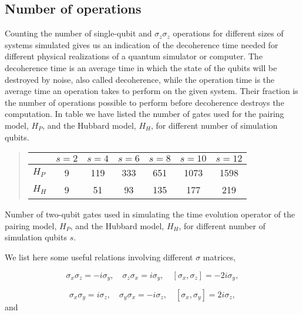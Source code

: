 \documentclass[%
oneside,                 %
final,                   %
10pt]{article}
\begin{document}
\subsection{Number of operations}

Counting the number of single-qubit and $\sigma_z\sigma_z$ operations
for different sizes of systems simulated gives us an indication of the
decoherence time needed for different physical realizations of a
quantum simulator or computer. The decoherence time is an average time
in which the state of the qubits will be destroyed by noise, also called 
decoherence, while the operation time is the average time an operation takes
to perform on the given system. Their fraction is the number of
operations possible to perform before decoherence destroys the
computation. In table  we have listed the number of
gates used for the pairing model, $H_P$, and the Hubbard model, $H_H$,
for different number of simulation qubits. 


\begin{quote}
\begin{tabular}{lcccccc}
\hline
\multicolumn{1}{c}{  } & \multicolumn{1}{c}{ $s=2$ } & \multicolumn{1}{c}{ $s=4$ } & \multicolumn{1}{c}{ $s=6$ } & \multicolumn{1}{c}{ $s=8$ } & \multicolumn{1}{c}{ $s=10$ } & \multicolumn{1}{c}{ $s=12$ } \\
\hline
$H_P$ & 9     & 119   & 333   & 651   & 1073   & 1598   \\
$H_H$ & 9     & 51    & 93    & 135   & 177    & 219    \\
\hline
\end{tabular}
\end{quote}

\noindent
Number of two-qubit gates used in simulating the time
  evolution operator of the pairing model, $H_P$, and the Hubbard
  model, $H_H$, for different number of simulation qubits $s$.

We list here some useful relations involving different $\sigma$ matrices,

\begin{equation}
\sigma_x \sigma_z = -i\sigma_y, \quad
\sigma_z \sigma_x = i\sigma_y, \quad [\sigma_x, \sigma_z]=-2i\sigma_y,
\end{equation}

\begin{equation}
\sigma_x \sigma_y = i\sigma_z, \quad
\sigma_y \sigma_x = -i\sigma_z, \quad [\sigma_x, \sigma_y]=2i\sigma_z,
\end{equation}
and
\end{document}
